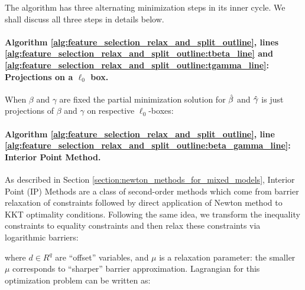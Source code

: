 \documentclass[11pt,letterpaper]{article}
\numberwithin{equation}{section} %
\numberwithin{figure}{section} %
\numberwithin{table}{section} %
\begin{document}
The algorithm has three alternating minimization steps in its inner cycle. We shall discuss all three steps in details below. 

\paragraph{Algorithm \ref{alg:feature_selection_relax_and_split_outline}, lines \ref{alg:feature_selection_relax_and_split_outline:tbeta_line} and \ref{alg:feature_selection_relax_and_split_outline:tgamma_line}: Projections on a $\ell_0$ box.} When $\beta$ and $\gamma$ are fixed the partial minimization solution for $\hat\beta$ and $\hat\gamma$ is just projections of $\beta$ and $\gamma$ on respective $\ell_0$-boxes:


\paragraph{Algorithm \ref{alg:feature_selection_relax_and_split_outline}, line \ref{alg:feature_selection_relax_and_split_outline:beta_gamma_line}: Interior Point Method.}

As described in Section \ref{section:newton_methods_for_mixed_models}, Interior Point (IP) Methods are a class of second-order methods which come from barrier relaxation of constraints followed by direct application of Newton method to KKT optimality conditions. Following the same idea, we transform the inequality constraints to equality constraints and then relax these constraints via logarithmic barriers:




where $d \in R^{q}$ are ``offset''  variables, and $\mu$ is a relaxation parameter: the smaller $\mu$ corresponds to ``sharper'' barrier approximation.  Lagrangian for this optimization problem can be written as:
\end{document}
